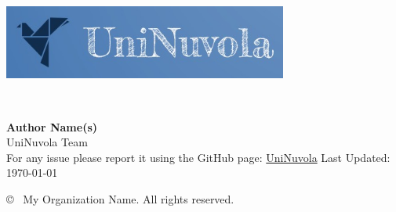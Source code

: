 \begin{titlepage}
    \thispagestyle{empty}
    \begin{center}
        \vspace*{1.5cm}
        \includegraphics[width=0.7\textwidth]{img/uninuvola_logo.jpeg} %


        \vspace{2.5cm}
        {\Huge \bfseries \doctitle} \\[1ex] %

        {\large \textit{\docsubtitle}} %

        \vspace{2.5cm}
        {\large \textbf{Author Name(s)}\\UniNuvola Team} \\[0.5ex] %

        \vspace{2.5cm}
        {\large For any issue please report it using the GitHub page: \href{https://github.com/UniNuvola/UniNuvola}{UniNuvola}}
        \vfill
        {\normalsize Last Updated: \today} %

        \vspace{1cm}
        {\small © \the\year\ My Organization Name. All rights reserved.} %
    \end{center}
\end{titlepage}